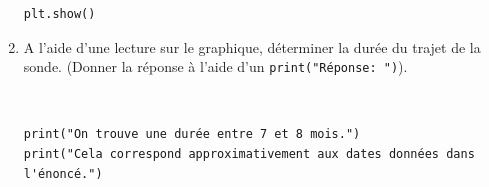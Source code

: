 \begin{enumerate}
\begin{solution}
\begin{verbatim}
plt.show()
\end{verbatim}
\end{solution}

\item A l'aide d'une lecture sur le graphique, déterminer la durée du trajet de la sonde. (Donner la réponse à l'aide d'un \verb?print("Réponse: ")?).

\begin{solution}~\ \\
\begin{verbatim}
print("On trouve une durée entre 7 et 8 mois.")
print("Cela correspond approximativement aux dates données dans l'énoncé.")
\end{verbatim}
\end{solution}

\end{enumerate}

